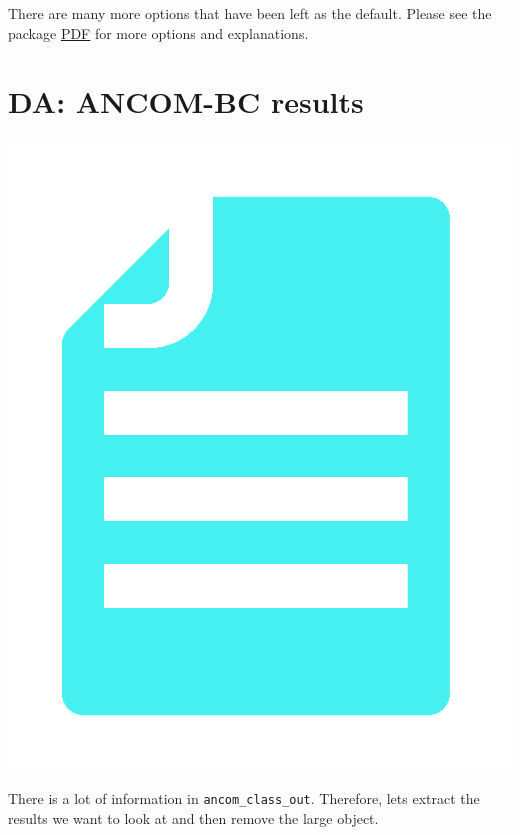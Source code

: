\documentclass[
]{book}
\newenvironment{Shaded}{\begin{snugshade}}{\end{snugshade}}
\newcommand{\CommentTok}[1]{\textcolor[rgb]{0.56,0.35,0.01}{\textit{#1}}}
\newcommand{\FunctionTok}[1]{\textcolor[rgb]{0.13,0.29,0.53}{\textbf{#1}}}
\newcommand{\NormalTok}[1]{#1}
\newcommand{\OtherTok}[1]{\textcolor[rgb]{0.56,0.35,0.01}{#1}}
\newcommand{\SpecialCharTok}[1]{\textcolor[rgb]{0.81,0.36,0.00}{\textbf{#1}}}
\begin{document}
There are many more options that have been left as the default.
Please see the package \href{https://bioc.ism.ac.jp/packages/devel/bioc/manuals/ANCOMBC/man/ANCOMBC.pdf}{PDF} for more options and explanations.

\hypertarget{da-ancom-bc-results}{%
\section{DA: ANCOM-BC results}\label{da-ancom-bc-results}}

\includegraphics{figures/output_file_blue.png}

There is a lot of information in \texttt{ancom\_class\_out}.
Therefore, lets extract the results we want to look at and then remove the large object.

\begin{Shaded}
\end{Shaded}
\end{document}
